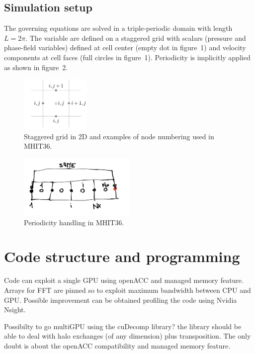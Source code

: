 \documentclass[11pt]{article}
\begin{document}
\subsection{Simulation setup}
The governing equations are solved in a triple-periodic domain with length $L=2 \pi$.
The variable are defined on a staggered grid with scalars (pressure and phase-field variables) defined at cell center (empty dot in figure~1) and velocity components at cell faces (full circles in figure~1).
Periodicity is implicitly applied as shown in figure~2.






\begin{figure}[!t]
\centering
    \includegraphics[width=0.3\textwidth]{staggered_2.png} 
    \caption{Staggered grid in 2D and examples of node numbering used in MHIT36.}
    \label{fig1}
\end{figure}

\begin{figure}[!t]
\centering
    \includegraphics[width=0.5\textwidth]{draw.png} 
    \caption{Periodicity handling in MHIT36.}
    \label{fig2}
\end{figure}


\section{Code structure and programming}
Code can exploit a single GPU using openACC and managed memory feature.
Arrays for FFT are pinned so to exploit maximum bandwidth between CPU and GPU.
Possible improvement can be obtained profiling the code using Nvidia Nsight.

Possibilty to go multiGPU using the cuDecomp library? the library should be able to deal with halo exchanges (of any dimension) plus transposition.
The only doubt is about the openACC compatibility and managed memory feature.
\end{document}
